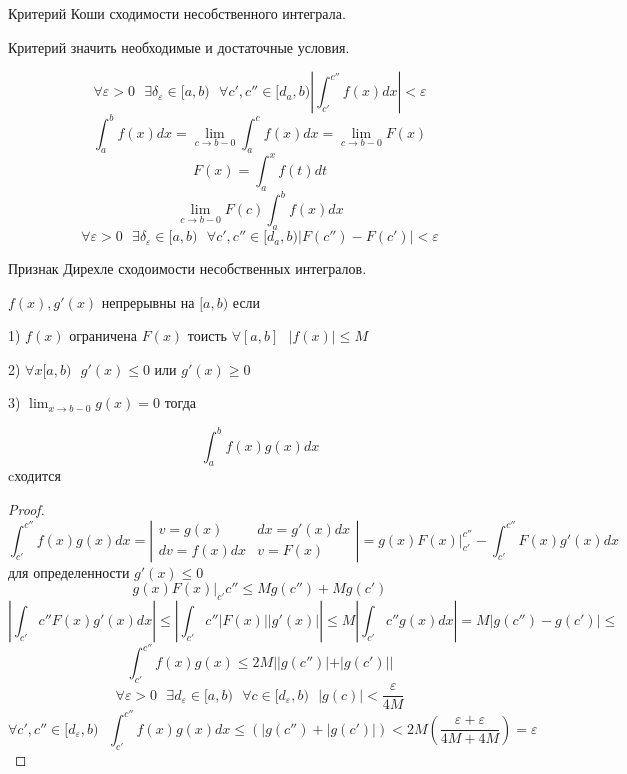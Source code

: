 \begin{title}[\Large]
  Критерий Коши сходимости несобственного интеграла.
\end{title}
Критерий значить необходимые и достаточные условия.

$$
\forall \varepsilon > 0 ~~~ \exists \delta_{\varepsilon} \in [a,b) ~~~
\forall c', c'' \in [d_a, b) \left| \int_{c'}^{c''} f(x)dx \right| < \varepsilon
$$
$$
\int_a^b f(x)dx = \lim_{c \to b-0} \int_a^c f(x)dx = \lim_{c \to b-0} F(x)
$$
$$
F(x) = \int_a^x f(t)dt
$$
$$
\lim_{c \to b-0} F(c) \int_a^b f(x)dx
$$
$$
\forall \varepsilon > 0 ~~~ \exists \delta_{\varepsilon} \in [a,b) ~~~
\forall c', c'' \in [d_a, b) |F(c'') - F(c')| < \varepsilon
$$

\begin{title}[\Large]
  Признак Дирехле сходоимости несобственных интегралов.
\end{title}

\begin{theorem}
  $f(x), g'(x)$ непрерывны на $[a,b)$ если

  1) $f(x)$ ограничена $F(x)$ тоисть $\forall [a,b] ~~~ |f(x)| \le M$

  2) $\forall x[a,b) ~~~ g'(x) \le 0$ или $g'(x) \ge 0$

  3) $\lim_{x \to b-0} g(x) = 0$ тогда

  $$\int_a^b f(x)g(x)dx$$ cходится
\end{theorem}

\begin{proof}
  $$
  \int_{c'}^{c''} f(x)g(x)dx =
  \left|
    \begin{array}{ll}
      v = g(x)    & dx = g'(x)dx \\
      dv = f(x)dx & v = F(x)
    \end{array}
  \right|
  = g(x)F(x)|_{c'}^{c''} - \int_{c'}^{c''} F(x)g'(x)dx
  $$
  для определенности $g'(x) \le 0$
  $$
  g(x)F(x)|_{c'}{c''} \le M g(c'') + M g(c')
  $$
  $$
  \left| \int_{c'}{c''} F(x)g'(x)dx \right| \le
  \left| \int_{c'}{c''} |F(x)||g'(x)| \right| \le
  M \left| \int_{c'}{c''} g(x)dx \right| = M|g(c'') - g(c')| \le
  $$
  $$
  \int_{c'}^{c''} f(x)g(x) \le 2M||g(c'')| + |g(c')||
  $$
  $$
  \forall \varepsilon > 0 ~~~ \exists d_{\varepsilon} \in [a,b) ~~~
  \forall c \in [d_{\varepsilon}, b) ~~~ |g(c)| < \frac{\varepsilon}{4M}
  $$
  $$
  \forall c', c'' \in [d_{\varepsilon}, b) ~~~ \int_{c'}^{c''} f(x)g(x)dx \le
  (|g(c'') + |g(c')|) <
  2M \left(\frac{\varepsilon + \varepsilon}{4M + 4M}\right) = \varepsilon
  $$
\end{proof}

